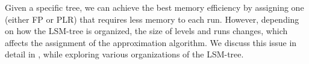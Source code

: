 Given a specific tree, we can achieve the best memory efficiency
by assigning one (either FP or PLR) 
that requires less memory to each run.
However, depending on how the LSM-tree is organized, the size of levels and runs changes,
which affects the assignment of the approximation algorithm.  
We discuss this issue in detail in ,
while exploring various organizations of the LSM-tree.

